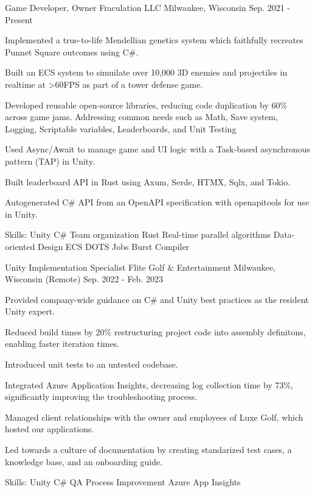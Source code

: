 \begin{cventries}
  \cventry
    {Game Developer, Owner} %
    {Fraculation LLC} %
    {Milwaukee, Wisconsin} %
    {Sep. 2021 - Present} %
    {
      \begin{cvitems} %
        \item {Implemented a true-to-life Mendellian genetics system which faithfully recreates Punnet Square outcomes using C\#.}
        \item {Built an ECS system to simuilate over 10,000 3D enemies and projectiles in realtime at >60FPS as part of a tower defense game.}
        \item {Developed reusable open-source libraries, reducing code duplication by 60\% across game jams. Addressing common needs such as Math, Save system, Logging, Scriptable variables, Leaderboards, and Unit Testing}
        \item {Used Async/Await to manage game and UI logic with a Task-based asynchronous pattern (TAP) in Unity.}
        \item {Built leaderboard API in Rust using Axum, Serde, HTMX, Sqlx, and Tokio.}
        \item {Autogenerated C\# API from an OpenAPI specification with openapitools for use in Unity.}
        \item {Skills: Unity \textbullet{} C\# \textbullet{} Team organization \textbullet{} Rust \textbullet{} Real-time parallel algorithms \textbullet{} Data-oriented Design \textbullet{} ECS \textbullet{} DOTS \textbullet{} Jobs \textbullet{} Burst Compiler}
      \end{cvitems}
    }

  \cventry
    {Unity Implementation Specialist} %
    {Flite Golf \& Entertainment} %
    {Milwaukee, Wisconsin (Remote)} %
    {Sep. 2022 - Feb. 2023} %
    {
      \begin{cvitems} %
        \item {Provided company-wide guidance on C\# and Unity best practices as the resident Unity expert.}
        \item {Reduced build times by 20\% restructuring project code into assembly definitons, enabling faster iteration times.}
        \item {Introduced unit tests to an untested codebase.}
        \item {Integrated Azure Application Insights, decreasing log collection time by 73\%, significantly improving the troubleshooting process.}
        \item {Managed client relationships with the owner and employees of Luxe Golf, which hosted our applications.}
        \item {Led towards a culture of documentation by creating standarized test cases, a knowledge base, and an onboarding guide.}
        \item {Skills: Unity \textbullet{} C\# \textbullet{} QA Process Improvement \textbullet{} Azure App Insights}
      \end{cvitems}
    }


\end{cventries}
